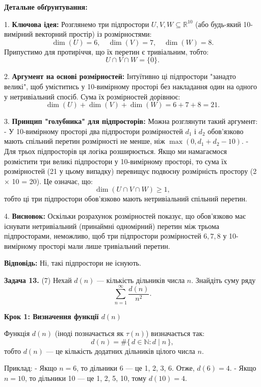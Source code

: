 \documentclass{article}
\begin{document}
\textbf{Детальне обґрунтування:}

1. \textbf{Ключова ідея:}  
   Розглянемо три підпростори \(U, V, W \subseteq \mathbb{R}^{10}\) (або будь-який 10-вимірний векторний простір) із розмірностями:
   \[
   \dim(U) = 6,\quad \dim(V) = 7,\quad \dim(W) = 8.
   \]
   Припустимо для протиріччя, що їх перетин є тривіальним, тобто:
   \[
   U \cap V \cap W = \{0\}.
   \]

2. \textbf{Аргумент на основі розмірностей:}  
   Інтуїтивно ці підпростори "занадто великі", щоб уміститись у 10-вимірному просторі без накладання один на одного у нетривіальний спосіб. Сума їх розмірностей дорівнює:
   \[
   \dim(U) + \dim(V) + \dim(W) = 6 + 7 + 8 = 21.
   \]

3. \textbf{Принцип "голубника" для підпросторів:}  
   Можна розглянути такий аргумент:
   - У 10-вимірному просторі два підпростори розмірностей \(d_1\) і \(d_2\) обов’язково мають спільний перетин розмірності не менше, ніж \(\max(0, d_1 + d_2 - 10)\).
   - Для трьох підпросторів ця логіка розширюється. Якщо ми намагаємося розмістити три великі підпростори у 10-вимірному просторі, то сума їх розмірностей (21 у цьому випадку) перевищує подвоєну розмірність простору (2 × 10 = 20). Це означає, що:
     \[
     \dim(U \cap V \cap W) \geq 1,
     \]
     тобто ці три підпростори обов’язково мають нетривіальний спільний перетин.

4. \textbf{Висновок:}  
   Оскільки розрахунок розмірностей показує, що обов’язково має існувати нетривіальний (принаймні одномірний) перетин між трьома підпросторами, неможливо, щоб три підпростори розмірностей \(6, 7, 8\) у 10-вимірному просторі мали лише тривіальний перетин.

\textbf{Відповідь:} Ні, такі підпростори не існують.


\bigskip

\noindent\textbf{Задача 13.} (7) Нехай \( d(n) \) — кількість дільників числа \( n \). Знайдіть суму ряду
\[
\sum_{n=1}^{\infty} \frac{d(n)}{n^2}.
\]

\textbf{Крок 1: Визначення функції \( d(n) \)}

Функція \( d(n) \) (іноді позначається як \(\tau(n)\)) визначається так:  
\[
d(n) = \#\{\,d \in \mathbb{N} : d \mid n\,\},
\]
тобто \( d(n) \) — це кількість додатних дільників цілого числа \( n \).

Приклад:  
- Якщо \( n = 6 \), то дільники 6 — це 1, 2, 3, 6. Отже, \( d(6) = 4 \).  
- Якщо \( n = 10 \), то дільники 10 — це 1, 2, 5, 10, тому \( d(10) = 4 \).
\end{document}
